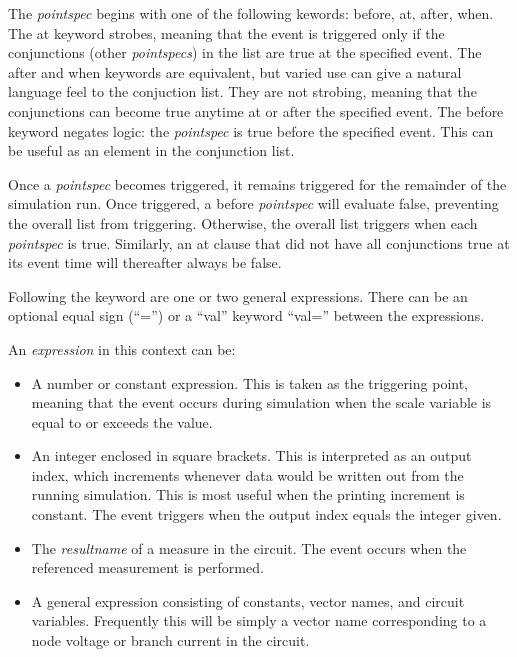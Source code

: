 The {\it pointspec} begins with one of the following kewords:  {\vt
before}, {\vt at}, {\vt after}, {\vt when}.  The {\vt at} keyword
strobes, meaning that the event is triggered only if the conjunctions
(other {\it pointspecs}) in the list are true at the specified event. 
The {\vt after} and {\vt when} keywords are equivalent, but varied use
can give a natural language feel to the conjuction list.  They are not
strobing, meaning that the conjunctions can become true anytime at or
after the specified event.  The {\vt before} keyword negates logic: 
the {\it pointspec} is true before the specified event.  This can be
useful as an element in the conjunction list.

Once a {\it pointspec} becomes triggered, it remains triggered for the
remainder of the simulation run.  Once triggered, a {\vt before} {\it
pointspec} will evaluate false, preventing the overall list from
triggering.  Otherwise, the overall list triggers when each {\it
pointspec} is true.  Similarly, an {\vt at} clause that did not have
all conjunctions true at its event time will thereafter always be
false.

Following the keyword are one or two general expressions.  There can
be an optional equal sign (``{\vt =}'') or a ``{\vt val}'' keyword
``{\vt val=}'' between the expressions.

An {\it expression} in this context can be:
\begin{itemize}
\item{A number or constant expression.  This is taken as the
triggering point, meaning that the event occurs during simulation when
the scale variable is equal to or exceeds the value.}

\item{An integer enclosed in square brackets.  This is interpreted as
an output index, which increments whenever data would be written out
from the running simulation.  This is most useful when the printing
increment is constant.  The event triggers when the output index
equals the integer given.}

\item{The {\it resultname} of a measure in the circuit.  The event
occurs when the referenced measurement is performed.}

\item{A general expression consisting of constants, vector names, and
circuit variables.  Frequently this will be simply a vector name
corresponding to a node voltage or branch current in the circuit.}
\end{itemize}

